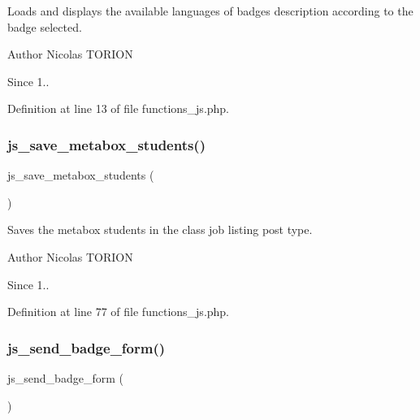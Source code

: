 Loads and displays the available languages of badge\textquotesingle{}s description according to the badge selected.

\begin{DoxyAuthor}{Author}
Nicolas T\+O\+R\+I\+ON 
\end{DoxyAuthor}
\begin{DoxySince}{Since}
1.. 
\end{DoxySince}


Definition at line 13 of file functions\+\_\+js.\+php.

\mbox{\label{functions__js_8php_ab7dc6ec316c73c2bbbbb7b36139eb729}} 
\subsubsection{\texorpdfstring{js\+\_\+save\+\_\+metabox\+\_\+students()}{js\_save\_metabox\_students()}}
{\footnotesize\ttfamily js\+\_\+save\+\_\+metabox\+\_\+students (\begin{DoxyParamCaption}{ }\end{DoxyParamCaption})}

Saves the metabox students in the class job listing post type.

\begin{DoxyAuthor}{Author}
Nicolas T\+O\+R\+I\+ON 
\end{DoxyAuthor}
\begin{DoxySince}{Since}
1.. 
\end{DoxySince}


Definition at line 77 of file functions\+\_\+js.\+php.

\mbox{\label{functions__js_8php_a7f99f817b8c8edf2fb928c67f28d7e61}} 
\subsubsection{\texorpdfstring{js\+\_\+send\+\_\+badge\+\_\+form()}{js\_send\_badge\_form()}}
{\footnotesize\ttfamily js\+\_\+send\+\_\+badge\+\_\+form (\begin{DoxyParamCaption}{ }\end{DoxyParamCaption})}

